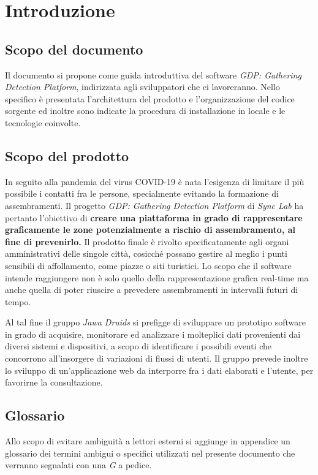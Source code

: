 \chapter{Introduzione}\label{Introduzione}

\section{Scopo del documento}\label{IntroduzioneScopoDelDocumento}
Il documento si propone come guida introduttiva del software \textit{GDP: Gathering Detection Platform}, indirizzata agli sviluppatori che ci lavoreranno. Nello specifico è presentata l'architettura del prodotto e l'organizzazione del codice sorgente ed inoltre sono indicate la procedura di installazione in locale e le tecnologie coinvolte.
\section{Scopo del prodotto}\label{1.2}
In seguito alla pandemia del virus COVID-19 è nata l'esigenza di limitare il più possibile i contatti fra le persone, specialmente evitando la formazione di assembramenti. Il progetto \textit{GDP: Gathering Detection Platform} di \textit{Sync Lab} ha pertanto l'obiettivo di \textbf{creare una piattaforma in grado di rappresentare graficamente le zone potenzialmente a rischio di assembramento, al fine di prevenirlo.}
Il prodotto finale è rivolto specificatamente agli organi amministrativi delle singole città, cosicché possano gestire al meglio i punti sensibili di affollamento, come piazze o siti turistici.
Lo scopo che il software intende raggiungere non è solo quello della rappresentazione grafica real-time ma anche quella di poter riuscire a prevedere assembramenti in intervalli futuri di tempo.

Al tal fine il gruppo \textit{Jawa Druids} si prefigge di sviluppare un prototipo software in grado di acquisire, monitorare ed analizzare i molteplici dati provenienti dai diversi sistemi e dispositivi, a scopo di identificare i possibili eventi che concorrono all’insorgere di variazioni di flussi di utenti. Il gruppo prevede inoltre lo sviluppo di un'applicazione web da interporre fra i dati elaborati e l'utente, per favorirne la consultazione.
\section{Glossario}\label{1.3}
Allo scopo di evitare ambiguità a lettori esterni si aggiunge in appendice un glossario dei
termini ambigui o specifici utilizzati nel presente documento che verranno segnalati con una \textit{G} a pedice.

